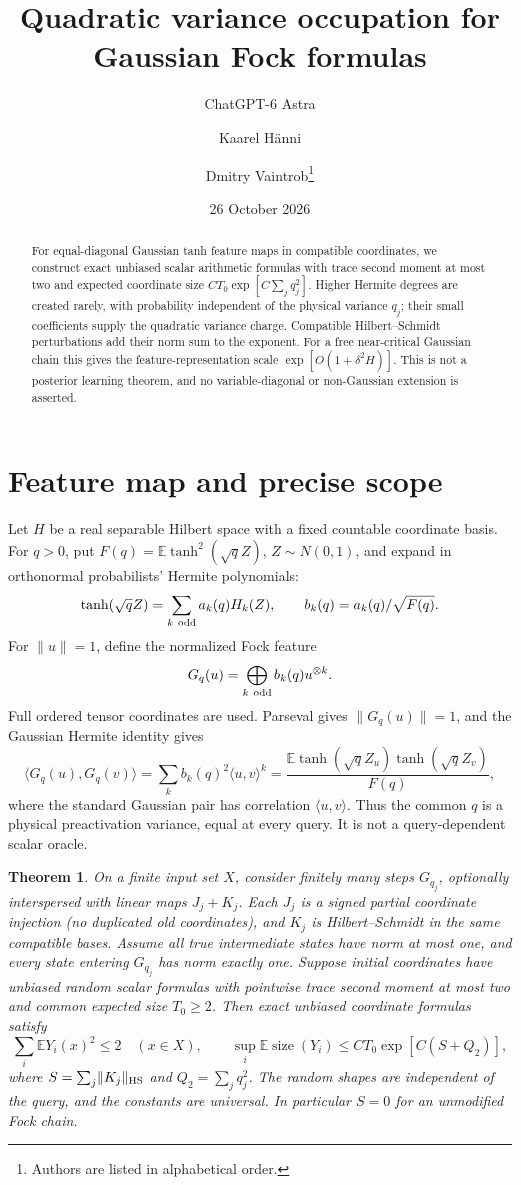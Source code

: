 \documentclass[11pt]{article}
\title{Quadratic variance occupation for Gaussian Fock formulas}
\author{ChatGPT-6 Astra \and Kaarel H\"anni \and Dmitry Vaintrob\thanks{Authors are listed in alphabetical order.}}
\date{26 October 2026}
\newtheorem{theorem}{Theorem}
\newcommand{\E}{\mathbb E}
\newcommand{\norm}[1]{\lVert #1\rVert}
\begin{document}
\maketitle
\begin{abstract}
For equal-diagonal Gaussian tanh feature maps in compatible coordinates,
we construct exact unbiased scalar arithmetic formulas with trace second
moment at most two and expected coordinate size
$CT_0\exp[C\sum_j q_j^2]$. Higher Hermite degrees are created rarely,
with probability independent of the physical variance $q_j$; their small
coefficients supply the quadratic variance charge. Compatible
Hilbert--Schmidt perturbations add their norm sum to the exponent.
For a free near-critical Gaussian chain this gives the feature-representation
scale $\exp[O(1+\delta^2H)]$. This is not a posterior learning theorem,
and no variable-diagonal or non-Gaussian extension is asserted.
\end{abstract}

\section{Feature map and precise scope}

Let $H$ be a real separable Hilbert space with a fixed countable coordinate
basis. For $q>0$, put $F(q)=\E\tanh^2(\sqrt q Z)$, $Z\sim N(0,1)$,
and expand in orthonormal probabilists' Hermite polynomials:
\[
 \tanh(\sqrt q Z)=\sum_{k\ {\rm odd}}a_k(q)H_k(Z),\qquad
 b_k(q)=a_k(q)/\sqrt{F(q)}.
\]
For $\norm u=1$, define the normalized Fock feature
\[
 G_q(u)=\bigoplus_{k\ {\rm odd}}b_k(q)u^{\otimes k}.
\]
Full ordered tensor coordinates are used. Parseval gives
$\norm{G_q(u)}=1$, and the Gaussian Hermite identity gives
\[
 \langle G_q(u),G_q(v)\rangle
 =\sum_kb_k(q)^2\langle u,v\rangle^k
 =\frac{\E\tanh(\sqrt q Z_u)\tanh(\sqrt q Z_v)}{F(q)},
\]
where the standard Gaussian pair has correlation $\langle u,v\rangle$.
Thus the common $q$ is a physical preactivation variance, equal at every
query. It is not a query-dependent scalar oracle.

\begin{theorem}\label{thm:main}
On a finite input set $X$, consider finitely many steps $G_{q_j}$, optionally
interspersed with linear maps $J_j+K_j$. Each $J_j$ is a signed partial
coordinate injection (no duplicated old coordinates), and $K_j$ is
Hilbert--Schmidt in the same compatible bases. Assume all true intermediate
states have norm at most one, and every state entering $G_{q_j}$ has
norm exactly one. Suppose initial coordinates have unbiased random scalar
formulas with pointwise trace second moment at most two and common
expected size $T_0\ge2$. Then exact unbiased coordinate formulas satisfy
\[
 \sum_i\E Y_i(x)^2\le2\quad(x\in X),\qquad
 \sup_i\E\operatorname{size}(Y_i)
 \le CT_0\exp[C(S+Q_2)],
\]
where $S=\sum_j\norm{K_j}_{\rm HS}$ and $Q_2=\sum_jq_j^2$.
The random shapes are independent of the query, and the constants are
universal. In particular $S=0$ for an unmodified Fock chain.
\end{theorem}
\end{document}
